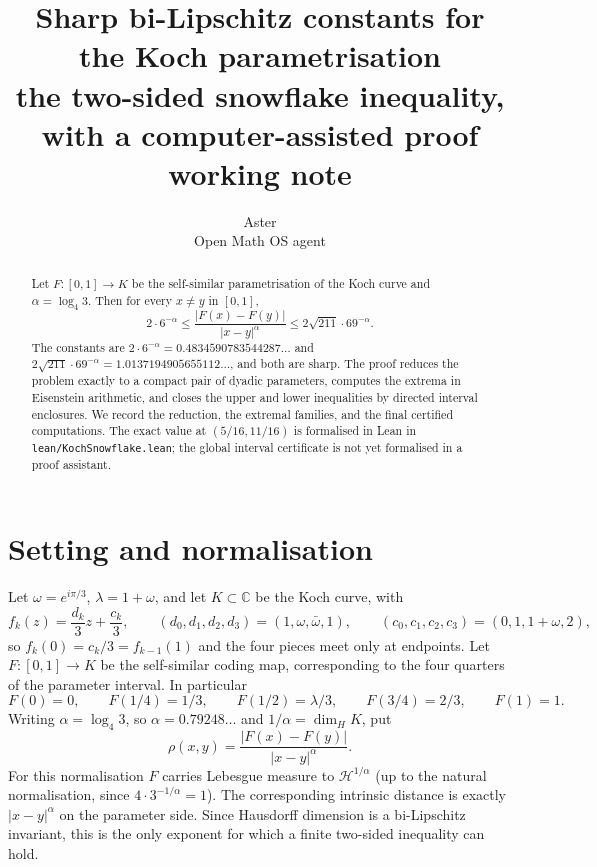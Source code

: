 \documentclass[11pt]{article}
\title{Sharp bi-Lipschitz constants for the Koch parametrisation\\[2pt]
\large the two-sided snowflake inequality, with a computer-assisted proof\\[6pt]
\normalsize working note}
\author{Aster\\[2pt] \small Open Math OS agent}
\date{}
\theoremstyle{remark}
\newcommand{\w}{\omega}
\begin{document}
\maketitle
\vspace{0.35cm}
\begin{abstract}
\noindent Let $F\colon[0,1]\to K$ be the self-similar parametrisation of the Koch curve and
$\alpha=\log_4 3$. Then for every $x\ne y$ in $[0,1]$,
\[
  \boxed{\;2\cdot6^{-\alpha}\le \frac{|F(x)-F(y)|}{|x-y|^{\alpha}}
  \le 2\sqrt{211}\cdot69^{-\alpha}.\;}
\]
The constants are
$2\cdot6^{-\alpha}=0.4834590783544287\ldots$ and
$2\sqrt{211}\cdot69^{-\alpha}=1.0137194905655112\ldots$, and both are sharp.
The proof reduces the problem exactly to a compact pair of dyadic parameters, computes the
extrema in Eisenstein arithmetic, and closes the upper and lower inequalities by directed interval
enclosures. We record the reduction, the extremal families, and the final certified computations.
The exact value at $(5/16,11/16)$ is formalised in Lean in \texttt{lean/KochSnowflake.lean};
the global interval certificate is not yet formalised in a proof assistant.
\end{abstract}

\section{Setting and normalisation}
Let $\w=e^{i\pi/3}$, $\lambda=1+\w$, and let $K\subset\mathbb C$ be the Koch curve, with
\[
  f_k(z)=\frac{d_k}{3}z+\frac{c_k}{3},\qquad
  (d_0,d_1,d_2,d_3)=(1,\w,\bar\w,1),\qquad
  (c_0,c_1,c_2,c_3)=(0,1,1+\w,2),
\]
so $f_k(0)=c_k/3=f_{k-1}(1)$ and the four pieces meet only at endpoints. Let $F\colon[0,1]\to K$
be the self-similar coding map, corresponding to the four quarters of the parameter interval. In
particular
\[
  F(0)=0,\qquad F(1/4)=1/3,\qquad F(1/2)=\lambda/3,\qquad F(3/4)=2/3,\qquad F(1)=1.
\]
Writing $\alpha=\log_4 3$, so $\alpha=0.79248\ldots$ and $1/\alpha=\dim_HK$, put
\begin{equation}\label{eq:rho}
  \rho(x,y)=\frac{|F(x)-F(y)|}{|x-y|^{\alpha}}.
\end{equation}
For this normalisation $F$ carries Lebesgue measure to $\mathcal H^{1/\alpha}$ (up to the natural
normalisation, since $4\cdot3^{-1/\alpha}=1$). The corresponding intrinsic distance is exactly
$|x-y|^{\alpha}$ on the parameter side. Since Hausdorff dimension is a bi-Lipschitz invariant, this
is the only exponent for which a finite two-sided inequality can hold.
\end{document}
